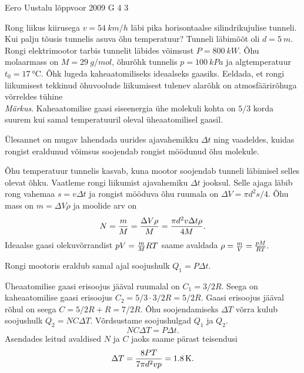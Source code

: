 {Eero Uustalu} %
{lõppvoor} %
{2009} %
{G 4} %
{3} %
{
\ifStatement
Rong liikus kiirusega $v=\SI{54}{km/h}$ läbi pika horisontaalse silindrikujulise tunneli.
Kui palju tõusis tunnelis asuva õhu temperatuur? Tunneli läbimõõt oli $d=\SI{5}{m}$.
Rongi elektrimootor tarbis tunnelit läbides võimsust $P=\SI{800}{kW}$.
Õhu molaarmass on $M=\SI{29}{g/mol}$, õhurõhk tunnelis $p=\SI{100}{kPa}$ ja algtemperatuur $t_0=\SI{17}{\celsius}$.
Õhk lugeda kaheaatomiliseks ideaalseks gaasiks. Eeldada, et rongi liikumisest tekkinud õhuvoolude liikumisest tulenev alarõhk on atmosfäärirõhuga võrreldes tühine\\
\emph{Märkus}. Kaheaatomilise gaasi siseenergia ühe molekuli kohta on $5/3$ korda suurem kui samal temperatuuril oleval üheaatomilisel gaasil.
\fi


\ifHint
Ülesannet on mugav lahendada uurides ajavahemikku $\Delta t$ ning vaadeldes, kuidas rongist eraldunud võimsus soojendab rongist möödunud õhu molekule.
\fi


\ifSolution
Õhu temperatuur tunnelis kasvab, kuna mootor soojendab tunneli läbimisel selles olevat õhku. Vaatleme rongi liikumist ajavahemiku $\Delta t$ jooksul. Selle ajaga läbib rong vahemaa $s = v \Delta t$ ja rongist mööduva õhu ruumala on $\Delta V = \pi d^2 s /4$. Õhu mass on $m = \Delta V \rho$ ja moolide arv on
\[
N = {m \over M}={\Delta V \rho \over M}={\pi d^2 v \Delta t\rho\over 4M}.
\]
Ideaalse gaasi olekuvõrrandist $pV={m\over M}RT$ saame avaldada $\rho={m\over V}={pM\over RT}.$

Rongi mootoris eraldub samal ajal soojushulk $Q_1 = P \Delta t$.

Üheaatomilise gaasi erisoojus jääval ruumalal on $C_1 = 3/2 R$. Seega on kaheaatomilise gaasi erisoojus $C_2 = 5/3 \cdot 3/2R = 5/2 R$. Gaasi erisoojus jääval rõhul on seega $C = 5/2R + R = 7/2 R$. Õhu soojendamiseks $\Delta T$ võrra kulub soojushulk $Q_2 = N C \Delta T$. Võrdsustame soojushulgad $Q_1$ ja $Q_2$.
\[
N C \Delta T = P \Delta t.
\]
Asendades leitud avaldised $N$ ja $C$ jaoks saame pärast teisendusi
\[
\Delta T = {8 P T \over 7\pi d^2 v p } = \SI{1.8}{K}.
\]
\fi
}